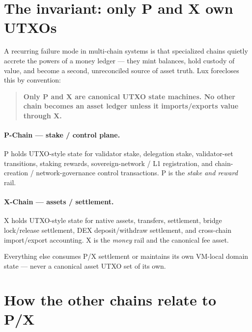 \documentclass[11pt,letterpaper]{article}
\newcommand{\chain}[1]{\textsf{#1}}
\begin{document}
\tableofcontents
\newpage

\section{The invariant: only P and X own UTXOs}

A recurring failure mode in multi-chain systems is that specialized chains
quietly accrete the powers of a money ledger --- they mint balances, hold
custody of value, and become a second, unreconciled source of asset truth. Lux
forecloses this by convention:

\begin{quote}
\textbf{Only \chain{P} and \chain{X} are canonical UTXO state machines. No other
chain becomes an asset ledger unless it imports/exports value through \chain{X}.}
\end{quote}

\paragraph{\chain{P}-Chain --- stake / control plane.} \chain{P} holds
UTXO-style state for validator stake, delegation stake, validator-set
transitions, staking rewards, sovereign-network / L1 registration, and
chain-creation / network-governance control transactions. \chain{P} is the
\emph{stake and reward} rail.

\paragraph{\chain{X}-Chain --- assets / settlement.} \chain{X} holds UTXO-style
state for native assets, transfers, settlement, bridge lock/release settlement,
DEX deposit/withdraw settlement, and cross-chain import/export accounting.
\chain{X} is the \emph{money} rail and the canonical fee asset.

Everything else consumes \chain{P}/\chain{X} settlement or maintains its own
VM-local domain state --- never a canonical asset UTXO set of its own.

\section{How the other chains relate to P/X}
\end{document}
